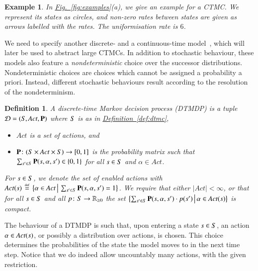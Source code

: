 \documentclass[10pt,twocolumn]{article}
\newtheorem{definition}{Definition}
\newtheorem{example}{Example}
\newcommand{\states} {{\ensuremath S}}
\newcommand{\state}  {{\ensuremath s}}
\newcommand{\reals}  {{\ensuremath {\mathbb{R}}}}
\newcommand{\acts}{\mathit{Act}}
\newcommand{\pmat}{\mathbf{P}}
\newcommand{\dmodel}{\mathcal{D}}
\newcommand{\act}{\alpha}
\newcommand{\refdef}[1]{\texorpdfstring{\hyperref[def:#1]{Definition~\ref*{def:#1}}}{Definition \ref*{def:#1}}}
\newcommand{\reffig}[1]{\texorpdfstring{\hyperref[fig:#1]{Fig.~\ref*{fig:#1}}}{Fig.~\ref*{fig:#1}}}
\newcommand{\defeq}{\,\stackrel{\mbox{\rm {\tiny def}}}{=}\,}
\begin{document}
\begin{example}
  \label{exa:ctmc}
In \reffig{examples}(a), we give an example for a CTMC.
  We represent its states as circles, and non-zero rates between states are given as arrows labelled with the rates.
  The uniformisation rate is $6$.
\end{example}

We need to specify another discrete- and a continuous-time model~\cite{Howard60,Bert05}, which will later be used to abstract large CTMCs.
In addition to stochastic behaviour, these models also feature a \emph{nondeterministic} choice over the successor distributions.
Nondeterministic choices are choices which cannot be assigned a probability a priori.
Instead, different stochastic behaviours result according to the resolution of the nondeterminism.
\begin{definition}
  \label{def:dtmdp}
A \emph{discrete-time Markov decision process (DTMDP)} is a tuple $\dmodel = (\states, \acts, \pmat)$ where $\states$ is as in \refdef{dtmc},
\begin{itemize}
  \item $\acts$ is a set of \emph{actions}, and
  \item $\pmat\colon (\states \times \acts \times \states) \to [0,1]$ is the \emph{probability matrix} such that $\sum_{\state' \in \states} \pmat(\state,\act,\state') \in \{0, 1\}$ for all $\state \in \states$ and $\act \in \acts$. 
  \end{itemize}
For $\state \in \states$, we denote the set of \emph{enabled} actions with $\acts(\state) \defeq \bigl\{ \act \in \acts\,\big|\,\sum_{\state' \in \states}  \pmat(\state,\act,\state') = 1 \bigr\}$.
  We require that either $|\acts|<\infty$, or that for all $\state \in \states$ and all $p\colon \states \to \reals_{\geq 0}$ the set $\bigl\{\sum_{\state' \in \states} \pmat(\state, \act, \state') \cdot p(\state')\,\big|\,\act \in \acts(\state) \bigr\}$ is compact.
\end{definition}
The behaviour of a DTMDP is such that, upon entering a state $\state \in \states$, an action $\act \in \acts(\state)$, or possibly a distribution over actions, is chosen.
This choice determines the probabilities of the state the model moves to in the next time step.
Notice that we do indeed allow uncountably many actions, with the given restriction.
\end{document}
